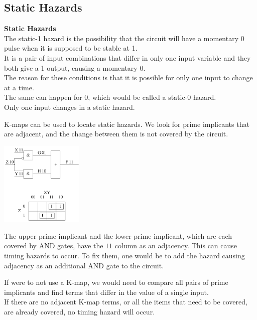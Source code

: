 \documentclass[nobib]{tufte-handout}
\begin{document}
    \subsection{Static Hazards}
    \begin{mdframed}
        \textbf{Static Hazards}\\
        The static-1 hazard is the possibility that the circuit will have a momentary 0 pulse when it is supposed to be stable at 1.\\
        It is a pair of input combinations that differ in only one input variable and they both give a 1 output, causing a momentary 0.\\
        The reason for these conditions is that it is possible for only one input to change at a time.\\
        The same can happen for 0, which would be called a static-0 hazard.\\
        Only one input changes in a static hazard.
    \end{mdframed}
    K-maps can be used to locate static hazards. We look for prime implicants that are adjacent, and the change between them is not covered by the circuit.\\
    \begin{center}
        \includegraphics[width = 150px]{images/kmaphazard.png}
    \end{center}
    The upper prime implicant and the lower prime implicant, which are each covered by AND gates, have the $11$ column as an adjacency. This can cause timing hazards to occur. To fix them, one would be to add the hazard causing adjacency as an additional AND gate to the circuit.\\
    \begin{center}
    \end{center}
    If were to not use a K-map, we would need to compare all pairs of prime implicants and find terms that differ in the value of a single input.\\
    If there are no adjacent K-map terms, or all the items that need to be covered, are already covered, no timing hazard will occur.
\end{document}
